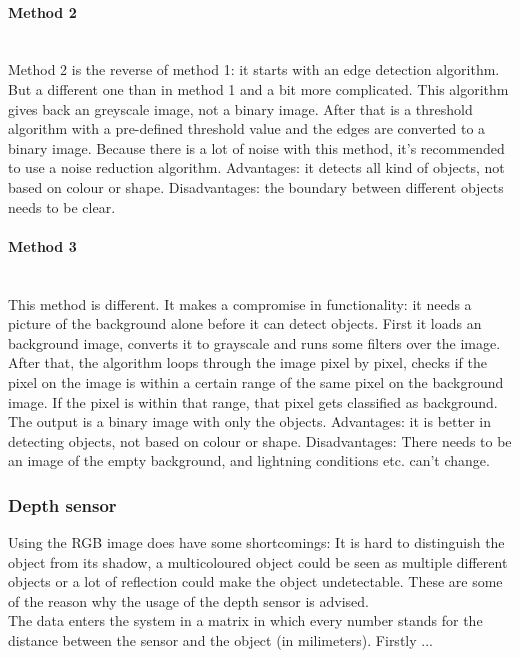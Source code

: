 \documentclass[11pt]{article}
\begin{document}
\paragraph{Method 2}\mbox{}\\
Method 2 is the reverse of method 1: it starts with an edge detection algorithm. But a different one than in method 1 and a bit more complicated. This algorithm gives back an greyscale image, not a binary image. After that is a threshold algorithm with a pre-defined threshold value and the edges are converted to a binary image. Because there is a lot of noise with this method, it's recommended to use a noise reduction algorithm. 
Advantages: it detects all kind of objects, not based on colour or shape.
Disadvantages: the boundary between different objects needs to be clear.
\paragraph{Method 3}\mbox{}\\
This method is different. It makes a compromise in functionality: it needs a picture of the background alone before it can detect objects. First it loads an background image, converts it to grayscale and runs some filters over the image. After that, the algorithm loops through the image pixel by pixel, checks if the pixel on the image is within a certain range of the same pixel on the background image. If the pixel is within that range, that pixel gets classified as background. The output is a binary image with only the objects.  
Advantages: it is better in detecting objects, not based on colour or shape.
Disadvantages: There needs to be an image of the empty background, and lightning conditions etc. can’t change.

\newpage


\subsubsection{Depth sensor}
Using the RGB image does have some shortcomings: It is hard to distinguish the object from its shadow, a multicoloured object could be seen as multiple different objects or a lot of reflection could make the object undetectable. These are some of the reason why the usage of the depth sensor is advised.
\\

The data enters the system in a matrix in which every number stands for the distance between the sensor and the object (in milimeters). Firstly ...  
\end{document}
